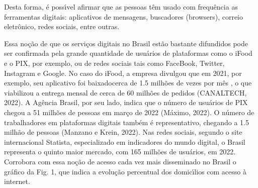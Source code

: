 \documentclass[
12pt,		%
openright,	%
twoside,  %
a4paper,			%
chapter=TITLE,		%
english,			%
french,				%
spanish,			%
brazil				%
]{USPSC-classe/USPSC}
\begin{document}
Desta forma, \'e poss\'{\i}vel afirmar que as pessoas t\^em usado com frequ\^encia  as ferramentas digitais: aplicativos de mensagens, buscadores (browsers), correio eletr\^onico, redes sociais, entre outras.

















Essa no\c{c}\~ao de que os servi\c{c}os digitais no Brasil est\~ao bastante difundidos pode ser confirmada pela grande quantidade de usu\'arios de plataformas como o iFood e o PIX, por exemplo, ou de redes sociais tais como FaceBook, Twitter, Instagram e Google. No caso do iFood, a empresa divulgou que em 2021, por exemplo, seu aplicativo foi \textquotedbl baixado\textquotedbl  cerca de 1.5 milh\~oes de vezes por m\^es , o que viabilizou a entrega mensal de cerca de 60 milh\~oes de pedidos  (CANALTECH, 2022). A Ag\^encia Brasil, por seu lado, indica que o n\'umero de usu\'arios de PIX chegou a 51 milh\~oes de pessoas em mar\c{c}o de 2022  (M\'aximo, 2022). O n\'umero de trabalhadores em plataformas digitais tamb\'em \'e representativo, chegando a 1.5 milh\~ao de pessoas  (Manzano e Krein, 2022). Nas redes sociais, segundo o site internacional Statista, especializado em indicadores do mundo digital, o Brasil representa o quinto maior mercado, com 165 milh\~oes de usu\'arios, em 2022. Corrobora com essa no\c{c}\~ao de acesso cada vez mais disseminado no Brasil o gr\'afico da Fig. 1, que indica a evolu\c{c}\~ao percentual dos domic\'{\i}lios com acesso \`a internet.
\end{document}

